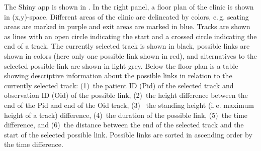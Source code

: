 \documentclass[fleqn,11pt]{wlscirep_supp}
\newcommand\ie{i.\,e.\xspace}
\newcommand\eg{e.\,g.\xspace}
\begin{document}
The Shiny app is shown in . In the right panel, a floor plan of the clinic is shown in (x,y)-space. Different areas of the clinic are delineated by colors, \eg seating areas are marked in purple and exit areas are marked in blue. Tracks are shown as lines with an open circle indicating the start and a crossed circle indicating the end of a track. The currently selected track is shown in black, possible links are shown in colors (here only one possible link shown in red), and alternatives to the selected possible link are shown in light grey. Below the floor plan is a table showing descriptive information about the possible links in relation to the currently selected track: (1)~the patient ID (Pid) of the selected track and observation ID (Oid) of the possible link, (2)~the height difference between the end of the Pid and end of the Oid track, (3)~ the standing height (\ie maximum height of a track) difference, (4)~the duration of the possible link, (5)~the time difference, and (6)~the distance between the end of the selected track and the start of the selected possible link. Possible links are sorted in ascending order by the time difference. 
\end{document}

